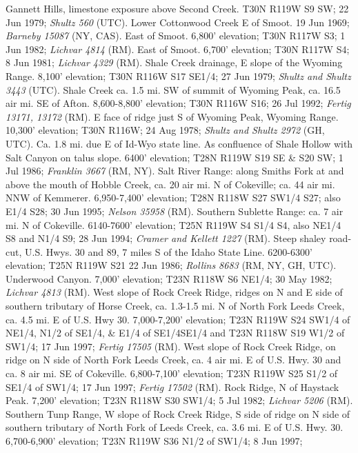 Gannett Hills, limestone exposure above Second Creek. T30N R119W S9 SW;
22 Jun 1979; \textit{Shultz 560} (UTC).
Lower Cottonwood Creek E of Smoot. 19 Jun 1969;
\textit{Barneby 15087} (NY, CAS).
East of Smoot. 6,800' elevation; T30N R117W S3; 1 Jun 1982;
\textit{Lichvar 4814} (RM).
East of Smoot. 6,700' elevation; T30N R117W S4; 8 Jun 1981;
\textit{Lichvar 4329} (RM).
Shale Creek drainage, E slope of the Wyoming Range. 8,100' elevation;
T30N R116W S17 SE1/4; 27 Jun 1979; \textit{Shultz and Shultz 3443} (UTC).
Shale Creek ca. 1.5 mi. SW of summit of Wyoming Peak, ca. 16.5 air mi. SE of
Afton. 8,600-8,800' elevation; T30N R116W S16; 26 Jul 1992;
\textit{Fertig 13171, 13172} (RM).
E face of ridge just S of Wyoming Peak, Wyoming Range. 10,300' elevation;
T30N R116W; 24 Aug 1978; \textit{Shultz and Shultz 2972} (GH, UTC).
Ca. 1.8 mi. due E of Id-Wyo state line. As confluence of Shale Hollow with
Salt Canyon on talus slope. 6400' elevation; T28N R119W S19 SE & S20 SW;
1 Jul 1986; \textit{Franklin 3667} (RM, NY).
Salt River Range: along Smiths Fork at and above the mouth of Hobble Creek,
ca. 20 air mi. N of Cokeville; ca. 44 air mi. NNW of Kemmerer.
6,950-7,400' elevation; T28N R118W S27 SW1/4 S27; also E1/4 S28; 30 Jun 1995;
\textit{Nelson 35958} (RM).
Southern Sublette Range: ca. 7 air mi. N of Cokeville. 6140-7600' elevation;
T25N R119W S4 S1/4 S4, also NE1/4 S8 and N1/4 S9; 28 Jun 1994;
\textit{Cramer and Kellett 1227} (RM).
Steep shaley road-cut, U.S. Hwys. 30 and 89, 7 miles S of the Idaho State Line.
6200-6300' elevation; T25N R119W S21 22 Jun 1986;
\textit{Rollins 8683} (RM, NY, GH, UTC).
Underwood Canyon. 7,000' elevation; T23N R118W S6 NE1/4; 30 May 1982;
\textit{Lichvar 4813} (RM).
West slope of Rock Creek Ridge, ridges on N and E side of southern tributary of
Horse Creek, ca. 1.3-1.5 mi. N of North Fork Leeds Creek, ca. 4.5 mi. E of U.S.
Hwy 30. 7,000-7,200' elevation; T23N R119W S24 SW1/4 of NE1/4, N1/2 of SE1/4, &
E1/4 of SE1/4SE1/4 and T23N R118W S19 W1/2 of SW1/4; 17 Jun 1997;
\textit{Fertig 17505} (RM).
West slope of Rock Creek Ridge, on ridge on N side of North Fork Leeds Creek,
ca. 4 air mi. E of U.S. Hwy. 30 and ca. 8 air mi. SE of Cokeville.
6,800-7,100' elevation; T23N R119W S25 S1/2 of SE1/4 of SW1/4; 17 Jun 1997;
\textit{Fertig 17502} (RM).
Rock Ridge, N of Haystack Peak. 7,200' elevation; T23N R118W S30 SW1/4;
5 Jul 1982; \textit{Lichvar 5206} (RM).
Southern Tunp Range, W slope of Rock Creek Ridge, S side of ridge on N side of
southern tributary of North Fork of Leeds Creek, ca. 3.6 mi. E of U.S. Hwy. 30.
6,700-6,900' elevation; T23N R119W S36 N1/2 of SW1/4; 8 Jun 1997;
